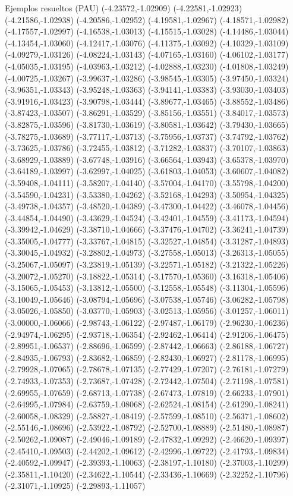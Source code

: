 \documentclass[11pt,a4paper]{article}
\begin{document}
\begin{fmex}{Ejemplos resueltos (PAU)}
(-4.23572,-1.02909) (-4.22581,-1.02923) (-4.21586,-1.02938) (-4.20586,-1.02952) (-4.19581,-1.02967) (-4.18571,-1.02982) (-4.17557,-1.02997) (-4.16538,-1.03013) (-4.15515,-1.03028) (-4.14486,-1.03044) (-4.13454,-1.03060) (-4.12417,-1.03076) (-4.11375,-1.03092) (-4.10329,-1.03109) (-4.09279,-1.03126) (-4.08224,-1.03143) (-4.07165,-1.03160) (-4.06102,-1.03177) (-4.05035,-1.03195) (-4.03963,-1.03212) (-4.02888,-1.03230) (-4.01808,-1.03249) (-4.00725,-1.03267) (-3.99637,-1.03286) (-3.98545,-1.03305) (-3.97450,-1.03324) (-3.96351,-1.03343) (-3.95248,-1.03363) (-3.94141,-1.03383) (-3.93030,-1.03403) (-3.91916,-1.03423) (-3.90798,-1.03444) (-3.89677,-1.03465) (-3.88552,-1.03486) (-3.87423,-1.03507) (-3.86291,-1.03529) (-3.85156,-1.03551) (-3.84017,-1.03573) (-3.82875,-1.03596) (-3.81730,-1.03619) (-3.80581,-1.03642) (-3.79430,-1.03665) (-3.78275,-1.03689) (-3.77117,-1.03713) (-3.75956,-1.03737) (-3.74792,-1.03762) (-3.73625,-1.03786) (-3.72455,-1.03812) (-3.71282,-1.03837) (-3.70107,-1.03863) (-3.68929,-1.03889) (-3.67748,-1.03916) (-3.66564,-1.03943) (-3.65378,-1.03970) (-3.64189,-1.03997) (-3.62997,-1.04025) (-3.61803,-1.04053) (-3.60607,-1.04082) (-3.59408,-1.04111) (-3.58207,-1.04140) (-3.57004,-1.04170) (-3.55798,-1.04200) (-3.54590,-1.04231) (-3.53380,-1.04262) (-3.52168,-1.04293) (-3.50954,-1.04325) (-3.49738,-1.04357) (-3.48520,-1.04389) (-3.47300,-1.04422) (-3.46078,-1.04456) (-3.44854,-1.04490) (-3.43629,-1.04524) (-3.42401,-1.04559) (-3.41173,-1.04594) (-3.39942,-1.04629) (-3.38710,-1.04666) (-3.37476,-1.04702) (-3.36241,-1.04739) (-3.35005,-1.04777) (-3.33767,-1.04815) (-3.32527,-1.04854) (-3.31287,-1.04893) (-3.30045,-1.04932) (-3.28802,-1.04973) (-3.27558,-1.05013) (-3.26313,-1.05055) (-3.25067,-1.05097) (-3.23819,-1.05139) (-3.22571,-1.05182) (-3.21322,-1.05226) (-3.20072,-1.05270) (-3.18822,-1.05314) (-3.17570,-1.05360) (-3.16318,-1.05406) (-3.15065,-1.05453) (-3.13812,-1.05500) (-3.12558,-1.05548) (-3.11304,-1.05596) (-3.10049,-1.05646) (-3.08794,-1.05696) (-3.07538,-1.05746) (-3.06282,-1.05798) (-3.05026,-1.05850) (-3.03770,-1.05903) (-3.02513,-1.05956) (-3.01257,-1.06011) (-3.00000,-1.06066) (-2.98743,-1.06122) (-2.97487,-1.06179) (-2.96230,-1.06236) (-2.94974,-1.06295) (-2.93718,-1.06354) (-2.92462,-1.06414) (-2.91206,-1.06475) (-2.89951,-1.06537) (-2.88696,-1.06599) (-2.87442,-1.06663) (-2.86188,-1.06727) (-2.84935,-1.06793) (-2.83682,-1.06859) (-2.82430,-1.06927) (-2.81178,-1.06995) (-2.79928,-1.07065) (-2.78678,-1.07135) (-2.77429,-1.07207) (-2.76181,-1.07279) (-2.74933,-1.07353) (-2.73687,-1.07428) (-2.72442,-1.07504) (-2.71198,-1.07581) (-2.69955,-1.07659) (-2.68713,-1.07738) (-2.67473,-1.07819) (-2.66233,-1.07901) (-2.64995,-1.07984) (-2.63759,-1.08068) (-2.62524,-1.08154) (-2.61290,-1.08241) (-2.60058,-1.08329) (-2.58827,-1.08419) (-2.57599,-1.08510) (-2.56371,-1.08602) (-2.55146,-1.08696) (-2.53922,-1.08792) (-2.52700,-1.08889) (-2.51480,-1.08987) (-2.50262,-1.09087) (-2.49046,-1.09189) (-2.47832,-1.09292) (-2.46620,-1.09397) (-2.45410,-1.09503) (-2.44202,-1.09612) (-2.42996,-1.09722) (-2.41793,-1.09834) (-2.40592,-1.09947) (-2.39393,-1.10063) (-2.38197,-1.10180) (-2.37003,-1.10299) (-2.35811,-1.10420) (-2.34622,-1.10544) (-2.33436,-1.10669) (-2.32252,-1.10796) (-2.31071,-1.10925) (-2.29893,-1.11057) 
\end{fmex}
\end{document}
